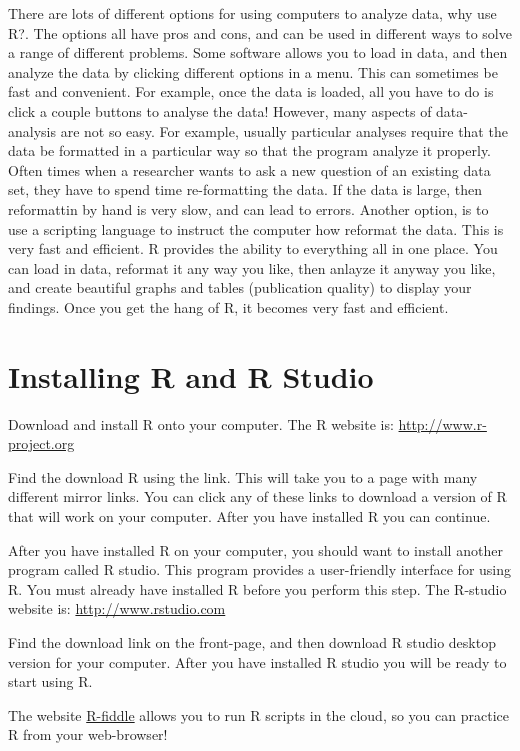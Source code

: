 \documentclass[]{book}
\theoremstyle{definition}
\theoremstyle{definition}
\theoremstyle{definition}
\theoremstyle{remark}
\begin{document}
There are lots of different options for using computers to analyze data,
why use R?. The options all have pros and cons, and can be used in
different ways to solve a range of different problems. Some software
allows you to load in data, and then analyze the data by clicking
different options in a menu. This can sometimes be fast and convenient.
For example, once the data is loaded, all you have to do is click a
couple buttons to analyse the data! However, many aspects of
data-analysis are not so easy. For example, usually particular analyses
require that the data be formatted in a particular way so that the
program analyze it properly. Often times when a researcher wants to ask
a new question of an existing data set, they have to spend time
re-formatting the data. If the data is large, then reformattin by hand
is very slow, and can lead to errors. Another option, is to use a
scripting language to instruct the computer how reformat the data. This
is very fast and efficient. R provides the ability to everything all in
one place. You can load in data, reformat it any way you like, then
anlayze it anyway you like, and create beautiful graphs and tables
(publication quality) to display your findings. Once you get the hang of
R, it becomes very fast and efficient.

\section{Installing R and R Studio}\label{installing-r-and-r-studio}

Download and install R onto your computer. The R website is:
\url{http://www.r-project.org}

Find the download R using the link. This will take you to a page with
many different mirror links. You can click any of these links to
download a version of R that will work on your computer. After you have
installed R you can continue.

After you have installed R on your computer, you should want to install
another program called R studio. This program provides a user-friendly
interface for using R. You must already have installed R before you
perform this step. The R-studio website is: \url{http://www.rstudio.com}

Find the download link on the front-page, and then download R studio
desktop version for your computer. After you have installed R studio you
will be ready to start using R.

The website \href{http://www.r-fiddle.org}{R-fiddle} allows you to run R
scripts in the cloud, so you can practice R from your web-browser!
\end{document}
